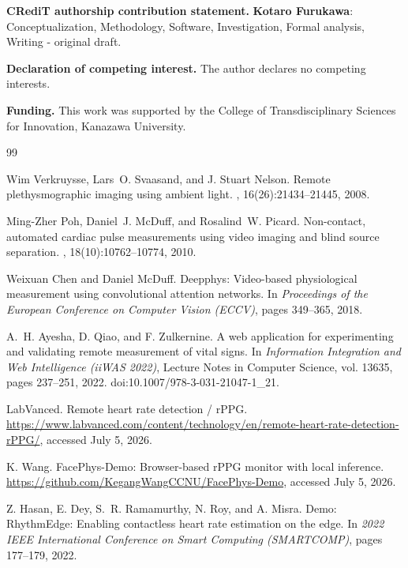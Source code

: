 \documentclass[dvipdfmx]{ehis}
\begin{document}
\textbf{CRediT authorship contribution statement.}
\textbf{Kotaro Furukawa}: Conceptualization, Methodology, Software, Investigation, Formal analysis, Writing - original draft.

\textbf{Declaration of competing interest.}
The author declares no competing interests.

\textbf{Funding.}
This work was supported by the College of Transdisciplinary Sciences for Innovation, Kanazawa University.

{\footnotesize
\begin{thebibliography}{99}
\footnotesize\baselineskip=8.0pt\setlength{\itemsep}{0pt}\setlength{\parsep}{0pt}

Wim Verkruysse, Lars~O. Svaasand, and J. Stuart Nelson.
\newblock Remote plethysmographic imaging using ambient light.
, 16(26):21434--21445, 2008.

Ming-Zher Poh, Daniel~J. McDuff, and Rosalind~W. Picard.
\newblock Non-contact, automated cardiac pulse measurements using video imaging and blind source separation.
, 18(10):10762--10774, 2010.

Weixuan Chen and Daniel McDuff.
\newblock Deepphys: Video-based physiological measurement using convolutional attention networks.
\newblock In {\em Proceedings of the European Conference on Computer Vision (ECCV)}, pages 349--365, 2018.

A.~H. Ayesha, D. Qiao, and F. Zulkernine.
\newblock A web application for experimenting and validating remote measurement of vital signs.
\newblock In {\em Information Integration and Web Intelligence (iiWAS 2022)}, Lecture Notes in Computer Science, vol. 13635, pages 237--251, 2022.
\newblock doi:10.1007/978-3-031-21047-1\_21.

LabVanced.
\newblock Remote heart rate detection / rPPG.
\newblock \url{https://www.labvanced.com/content/technology/en/remote-heart-rate-detection-rPPG/}, accessed July 5, 2026.

K. Wang.
\newblock FacePhys-Demo: Browser-based rPPG monitor with local inference.
\newblock \url{https://github.com/KegangWangCCNU/FacePhys-Demo}, accessed July 5, 2026.

Z. Hasan, E. Dey, S.~R. Ramamurthy, N. Roy, and A. Misra.
\newblock Demo: RhythmEdge: Enabling contactless heart rate estimation on the edge.
\newblock In {\em 2022 IEEE International Conference on Smart Computing (SMARTCOMP)}, pages 177--179, 2022.


\end{thebibliography}}
\end{document}
